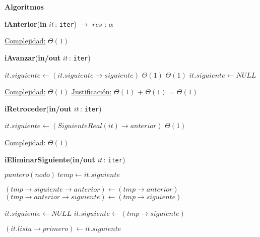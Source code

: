 \documentclass[a4paper,10pt]{article}
\let\TipoVariable=\texttt
\let\ModificadorArgumento=\textbf
\newcommand{\In}[2]{\ModificadorArgumento{in} \ensuremath{#1}\,: \TipoVariable{#2}\xspace}
\newcommand{\Inout}[2]{\ModificadorArgumento{in/out} \ensuremath{#1}\,: \TipoVariable{#2}\xspace}
\newenvironment{Algoritmos}{%
  \vspace*{2ex}%
  \noindent\textbf{\Large Algoritmos}%
  \vspace*{2ex}%
}{}
\begin{document}
\begin{Algoritmos}
\begin{algorithm}[H]{\textbf{iAnterior}(\In{it}{iter}) $\to$ $res$ : $\alpha$}
\begin{algorithmic}[1]
			\medskip
			\Statex \underline{Complejidad:} $\Theta(1)$
    	\end{algorithmic}
\end{algorithm}



\begin{algorithm}[H]
	\begin{algorithmic}[1]
		\State \textbf{iAvanzar}(\Inout{it}{iter})
		
			\State $it.siguiente \gets (it.siguiente\rightarrow siguiente)$	\Comment $\Theta(1)$
				\Comment $\Theta(1)$
				\State $it.siguiente \gets NULL$	
			\EndIf

			\medskip
			\Statex \underline{Complejidad:} $\Theta(1)$
			\Statex \underline{Justificación:}  $\Theta(1)$ + $\Theta(1)$ = $\Theta(1)$
    	\end{algorithmic}
\end{algorithm}
	
	
\begin{algorithm}[H]
	\begin{algorithmic}[1]
		\State \textbf{iRetroceder}(\Inout{it}{iter})
		
			\State $it.siguiente \gets (SiguienteReal(it)\rightarrow anterior)$	\Comment $\Theta(1)$

			\medskip
			\Statex \underline{Complejidad:} $\Theta(1)$
    	\end{algorithmic}
\end{algorithm}
	
	
\begin{algorithm}[H]
	\begin{algorithmic}[1]
		\State \textbf{iEliminarSiguiente}(\Inout{it}{iter})
		
			\State $puntero(nodo) \ temp \gets it.siguiente$
			
			\State $(tmp\rightarrow siguiente\rightarrow anterior) \gets (tmp\rightarrow anterior)$
			\State $(tmp\rightarrow anterior\rightarrow siguiente) \gets (tmp\rightarrow siguiente)$
		
				\State $it.siguiente \gets NULL$
			\Else
				\State $it.siguiente \gets (tmp\rightarrow siguiente)$	
			\EndIf
			
				\State $(it.lista\rightarrow primero) \gets it.siguiente$
			\EndIf
			

\end{algorithmic}
\end{algorithm}
\end{Algoritmos}
\end{document}
